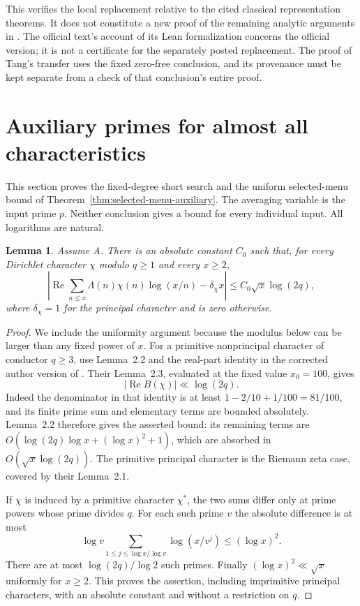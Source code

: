 \documentclass[11pt]{article}
\newtheorem{lemma}[theorem]{Lemma}
\theoremstyle{definition}
\theoremstyle{remark}
\begin{document}
This verifies the local replacement relative to the cited classical
representation theorems. It does not constitute a new proof of the
remaining analytic arguments in \cite{CT2026}. The official text's
account of its Lean formalization concerns the official version;
it is not a certificate for the separately posted replacement.
The proof of Tang's transfer uses the fixed zero-free conclusion,
and its provenance must be kept separate from a check of that
conclusion's entire proof.


\section{Auxiliary primes for almost all characteristics}

This section proves the fixed-degree short search and the uniform
selected-menu bound of Theorem~\ref{thm:selected-menu-auxiliary}.
The averaging variable is the input prime \(p\).
Neither conclusion gives a bound for every individual input.
All logarithms are natural.

\begin{lemma}\label{lem:dirichlet-log-weight}
Assume A.  There is an absolute constant $C_0$ such that, for every
Dirichlet character $\chi$ modulo $q\ge1$ and every $x\ge2$,
\[
 \left|\operatorname{Re}\sum_{n\le x}\Lambda(n)\chi(n)
                 \log(x/n)-\delta_\chi x\right|
 \le C_0\sqrt{x}\log(2q),
\]
where $\delta_\chi=1$ for the principal character and is zero otherwise.
\end{lemma}

\begin{proof}
We include the uniformity argument because the modulus below can be
larger than any fixed power of $x$.
For a primitive nonprincipal character of conductor $q\ge3$, use
Lemma~2.2 and the real-part identity in the corrected author version
of \citet[corrected author pp.~5--7, Lemmas~2.1--2.3]{LLS2015}.  Their Lemma~2.3, evaluated at the fixed value
$x_0=100$, gives
\[
 |\operatorname{Re}B(\chi)|\ll\log(2q).
\]
Indeed the denominator in that identity is at least
$1-2/10+1/100=81/100$, and its finite prime sum and elementary
terms are bounded absolutely.  Lemma~2.2 therefore gives the asserted
bound: its remaining terms are
$O(\log(2q)\log x+(\log x)^2+1)$, which are absorbed in
$O(\sqrt{x}\log(2q))$.  The primitive principal character is
the Riemann zeta case, covered by their Lemma~2.1.

If $\chi$ is induced by a primitive character $\chi^*$, the two sums
differ only at prime powers whose prime divides $q$.  For each such
prime $v$ the absolute difference is at most
\[
 \log v\sum_{1\le j\le\log x/\log v}\log(x/v^j)
 \le(\log x)^2.
\]
There are at most $\log(2q)/\log2$ such primes.  Finally
$(\log x)^2\ll\sqrt{x}$ uniformly for $x\ge2$.
This proves the assertion, including imprimitive principal characters,
with an absolute constant and without a restriction on $q$.
\end{proof}
\end{document}

